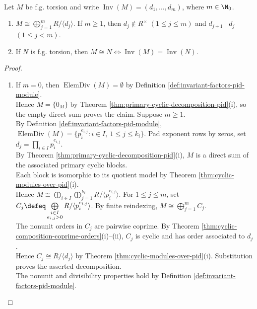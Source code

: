 \begin{theorem} \label{thm:pid-invariant-factor-decomposition} \\
Let $M$ be f.g. torsion and write $\operatorname{Inv}(M)=(d_1,\ldots,d_m)$, where $m\in\N_0$.
\begin{enumerate}[label=(\roman*)]
\setlength{\itemsep}{0pt}
\item $M\cong\bigoplus\limits_{j=1}^mR/\langle d_j\rangle$. If $m\geq1$, then $d_j\notin R^\times$ $(1\leq j\leq m)$ and $d_{j+1}\mid d_j$ $(1\leq j<m)$.
\item If $N$ is f.g. torsion, then $M\cong N\Longleftrightarrow\operatorname{Inv}(M)=\operatorname{Inv}(N)$.
\end{enumerate}
\begin{proof}
\begin{enumerate}[label=(\roman*)]
\setlength{\itemsep}{0pt}
\item[$(i)$] If $m=0$, then $\operatorname{ElemDiv}(M)=\emptyset$ by Definition \ref{def:invariant-factors-pid-module}.\\
Hence $M=\{0_M\}$ by Theorem \ref{thm:primary-cyclic-decomposition-pid}(i), so the empty direct sum proves the claim. Suppose $m\geq1$.\\
By Definition \ref{def:invariant-factors-pid-module}, $\operatorname{ElemDiv}(M)=\{p_i^{e_{i,j}}:i\in I,\ 1\leq j\leq k_i\}$. Pad exponent rows by zeros, set $d_j=\prod\limits_{i\in I}p_i^{e_{i,j}}$.\\
By Theorem \ref{thm:primary-cyclic-decomposition-pid}(i), $M$ is a direct sum of the associated primary cyclic blocks.\\
Each block is isomorphic to its quotient model by Theorem \ref{thm:cyclic-modules-over-pid}(i).\\
Hence $M\cong\bigoplus\limits_{i\in I}\bigoplus\limits_{j=1}^{k_i}R/\langle p_i^{e_{i,j}}\rangle$. For $1\leq j\leq m$, set $C_j\defeq\bigoplus\limits_{\substack{i\in I\\e_{i,j}>0}}R/\langle p_i^{e_{i,j}}\rangle$. By finite reindexing, $M\cong\bigoplus\limits_{j=1}^mC_j$.\\
The nonunit orders in $C_j$ are pairwise coprime. By Theorem \ref{thm:cyclic-composition-coprime-orders}(i)--(ii), $C_j$ is cyclic and has order associated to $d_j$.\\
Hence $C_j\cong R/\langle d_j\rangle$ by Theorem \ref{thm:cyclic-modules-over-pid}(i). Substitution proves the asserted decomposition.\\
The nonunit and divisibility properties hold by Definition \ref{def:invariant-factors-pid-module}.

\end{enumerate}
\end{proof}
\end{theorem}
